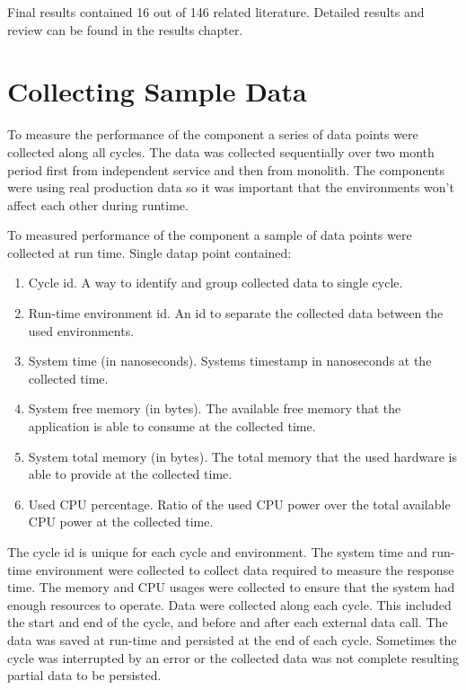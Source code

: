 Final results contained 16 out of 146 related literature.
Detailed results and review can be found in the results chapter.

\section{Collecting Sample Data}
To measure the performance of the component a series of data points were collected along all cycles.
The data was collected sequentially over two month period first from independent service and then from monolith.
The components were using real production data so it was important that the environments won't affect each other during runtime.

To measured performance of the component a sample of data points were collected at run time.
Single datap point contained:
\begin{enumerate}
    \item Cycle id. A way to identify and group collected data to single cycle.
    \item Run-time environment id. An id to separate the collected data between the used environments.
    \item System time (in nanoseconds). Systems timestamp in nanoseconds at the collected time.
    \item System free memory (in bytes). The available free memory that the application is able to consume at the collected time.
    \item System total memory (in bytes). The total memory that the used hardware is able to provide at the collected time.
    \item Used CPU percentage. Ratio of the used CPU power over the total available CPU power at the collected time.
\end{enumerate}

The cycle id is unique for each cycle and environment.
The system time and run-time environment were collected to collect data required to measure the response time.
The memory and CPU usages were collected to ensure that the system had enough resources to operate.
Data were collected along each cycle.
This included the start and end of the cycle, and before and after each external data call.
The data was saved at run-time and persisted at the end of each cycle.
Sometimes the cycle was interrupted by an error or the collected data was not complete resulting partial data to be persisted.

